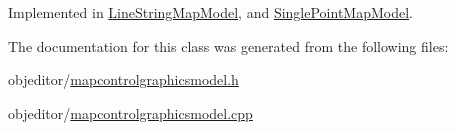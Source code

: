 Implemented in \mbox{\hyperlink{class_line_string_map_model_acdc4df56b2414a10f00f2f01b8418ea0}{Line\+String\+Map\+Model}}, and \mbox{\hyperlink{class_single_point_map_model_a40912bf3b978c4185ac9f390c55d37d6}{Single\+Point\+Map\+Model}}.



The documentation for this class was generated from the following files\+:\begin{DoxyCompactItemize}
\item 
objeditor/\mbox{\hyperlink{mapcontrolgraphicsmodel_8h}{mapcontrolgraphicsmodel.\+h}}\item 
objeditor/\mbox{\hyperlink{mapcontrolgraphicsmodel_8cpp}{mapcontrolgraphicsmodel.\+cpp}}\end{DoxyCompactItemize}
